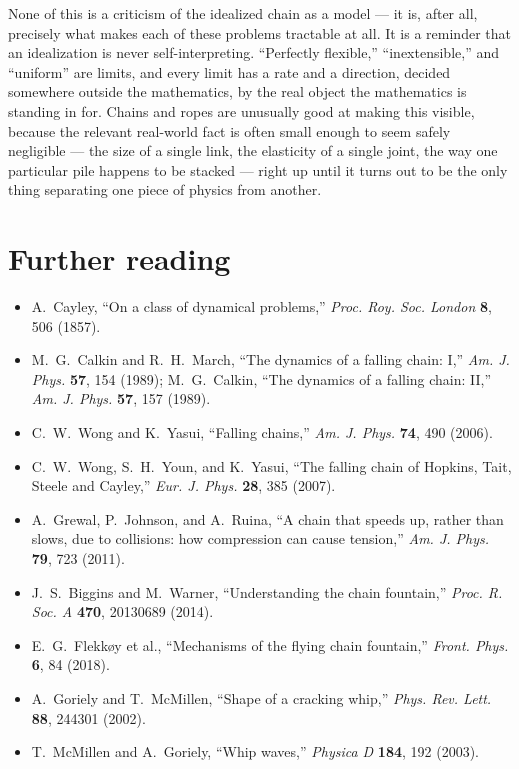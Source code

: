 \documentclass[11pt]{book}
\begin{document}
None of this is a criticism of the idealized chain as a model --- it is, after all, precisely what makes each of these problems tractable at all. It is a reminder that an idealization is never self-interpreting. ``Perfectly flexible,'' ``inextensible,'' and ``uniform'' are limits, and every limit has a rate and a direction, decided somewhere outside the mathematics, by the real object the mathematics is standing in for. Chains and ropes are unusually good at making this visible, because the relevant real-world fact is often small enough to seem safely negligible --- the size of a single link, the elasticity of a single joint, the way one particular pile happens to be stacked --- right up until it turns out to be the only thing separating one piece of physics from another.

\section*{Further reading}
\begin{itemize}
\item A.~Cayley, ``On a class of dynamical problems,'' \emph{Proc. Roy. Soc. London} \textbf{8}, 506 (1857).
\item M.~G.~Calkin and R.~H.~March, ``The dynamics of a falling chain: I,'' \emph{Am. J. Phys.} \textbf{57}, 154 (1989); M.~G.~Calkin, ``The dynamics of a falling chain: II,'' \emph{Am. J. Phys.} \textbf{57}, 157 (1989).
\item C.~W.~Wong and K.~Yasui, ``Falling chains,'' \emph{Am. J. Phys.} \textbf{74}, 490 (2006).
\item C.~W.~Wong, S.~H.~Youn, and K.~Yasui, ``The falling chain of Hopkins, Tait, Steele and Cayley,'' \emph{Eur. J. Phys.} \textbf{28}, 385 (2007).
\item A.~Grewal, P.~Johnson, and A.~Ruina, ``A chain that speeds up, rather than slows, due to collisions: how compression can cause tension,'' \emph{Am. J. Phys.} \textbf{79}, 723 (2011).
\item J.~S.~Biggins and M.~Warner, ``Understanding the chain fountain,'' \emph{Proc. R. Soc. A} \textbf{470}, 20130689 (2014).
\item E.~G.~Flekk{\o}y et al., ``Mechanisms of the flying chain fountain,'' \emph{Front. Phys.} \textbf{6}, 84 (2018).
\item A.~Goriely and T.~McMillen, ``Shape of a cracking whip,'' \emph{Phys. Rev. Lett.} \textbf{88}, 244301 (2002).
\item T.~McMillen and A.~Goriely, ``Whip waves,'' \emph{Physica D} \textbf{184}, 192 (2003).
\end{itemize}
\end{document}
